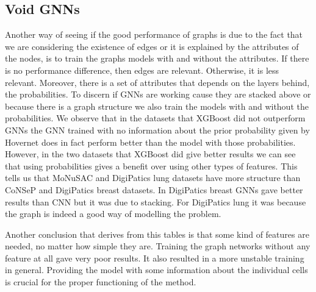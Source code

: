 \newpage
\subsection{Void GNNs}

Another way of seeing if the good performance of graphs is due to the fact that we are considering the existence of edges or it is explained by the attributes of the nodes, is to train the graphs models with and without the attributes. If there is no performance difference, then edges are relevant. Otherwise, it is less relevant. Moreover, there is a set of attributes that depends on the layers behind, the probabilities. To discern if GNNs are working cause they are stacked above or because there is a graph structure we also train the models with and without the probabilities. We observe that in the datasets that XGBoost did not outperform GNNs the GNN trained with no information about the prior probability given by Hovernet does in fact perform better than the model with those probabilities. However, in the two datasets that XGBoost did give better results we can see that using probabilities gives a benefit over using other types of features. This tells us that MoNuSAC and DigiPatics lung datasets have more structure than CoNSeP and DigiPatics breast datasets. In DigiPatics breast GNNs gave better results than CNN but it was due to stacking. For DigiPatics lung it was because the graph is indeed a good way of modelling the problem. 

Another conclusion that derives from this tables is that some kind of features are needed, no matter how simple they are. Training the graph networks without any feature at all gave very poor results. It also resulted in a more unstable training in general. Providing the model with some information about the individual cells is crucial for the proper functioning of the method.


